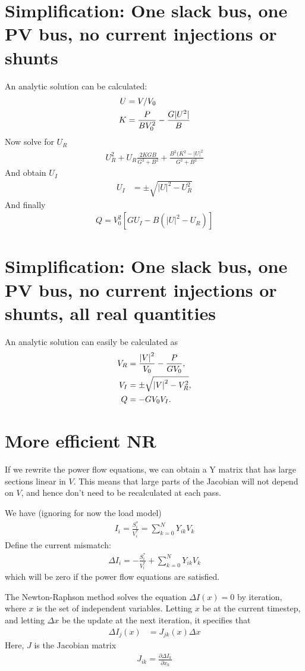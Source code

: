 \documentclass[11pt]{article}
\begin{document}
\section{Simplification: One slack bus, one PV bus, no current injections or shunts}
An analytic solution can be calculated:
\begin{align}
	U &= V/V_0 \notag \\
	K &= \frac{P}{BV_0^2}-\frac{G|U^2|}{B}
\end{align}
Now solve for $U_R$
\begin{align}
	U_R^2 + U_R\frac{2KGB}{G^2 + B^2}+\frac{B^2(K^2-|U|^2}{G^2+B^2}
\end{align}
And obtain $U_I$
\begin{align}
	U_I &= \pm\sqrt{|U|^2-U_R^2} 
\end{align}
And finally
\begin{align}
	Q = V_0^2\left[GU_I-B(|U|^2-U_R)\right]
\end{align}
\section{Simplification: One slack bus, one PV bus, no current injections or shunts, all real quantities}
An analytic solution can easily be calculated as
\begin{align}
	V_R &= \frac{\left|V\right|^2}{V_0}-\frac{P}{GV_0} ,\notag \\
	V_I &= \pm\sqrt{\left|V\right|^2 - V_R^2}, \notag \\
	Q &= -GV_0V_I.
\end{align}
\section{More efficient NR}
If we rewrite the power flow equations, we can obtain a Y matrix that has large sections linear in $V$. This means that large parts of the Jacobian will not depend on $V$, and hence don't need to be recalculated at each pass.

We have (ignoring for now the load model)
\begin{align}
I_i = \frac{S_i^*}{V_i^*} = \sum_{k=0}^NY_{ik}V_k
\end{align}
Define the current mismatch:
\begin{align}
\Delta I_i = -\frac{S^*_i}{V_i^*} + \sum_{k=0}^NY_{ik}V_k
\end{align}
which will be zero if the power flow equations are satisfied.

The Newton-Raphson method solves the equation $\Delta I(x) = 0$ by iteration, where $x$ is the set of independent variables. Letting $x$ be at the current timestep, and letting $\Delta x$ be the update at the next iteration, it specifies that
\begin{align}
\Delta I_j(x) &= J_{jk}(x) \Delta x
\end{align}
Here, $J$ is the Jacobian matrix
\begin{align}
J_{ik} = \frac{\partial \Delta I_k}{\partial x_k}
\end{align}
\end{document}
